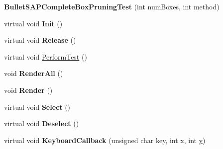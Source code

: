 \begin{DoxyCompactItemize}
\item 
\hypertarget{class_bullet_s_a_p_complete_box_pruning_test_a22620b06b80e57d7f88db4c8ce24dda7}{{\bfseries Bullet\+S\+A\+P\+Complete\+Box\+Pruning\+Test} (int num\+Boxes, int method)}\label{class_bullet_s_a_p_complete_box_pruning_test_a22620b06b80e57d7f88db4c8ce24dda7}

\item 
\hypertarget{class_bullet_s_a_p_complete_box_pruning_test_aa8e8f60057c773281c729fdcfbbc0212}{virtual void {\bfseries Init} ()}\label{class_bullet_s_a_p_complete_box_pruning_test_aa8e8f60057c773281c729fdcfbbc0212}

\item 
\hypertarget{class_bullet_s_a_p_complete_box_pruning_test_a7bbd4336f1ada389a32fe81e4b39b136}{virtual void {\bfseries Release} ()}\label{class_bullet_s_a_p_complete_box_pruning_test_a7bbd4336f1ada389a32fe81e4b39b136}

\item 
virtual void \hyperlink{class_bullet_s_a_p_complete_box_pruning_test_a08a41d61879ea44c1067dc6e5c84beb9}{Perform\+Test} ()
\item 
\hypertarget{class_bullet_s_a_p_complete_box_pruning_test_afbf20b80ce78fae72d856dcda51bc047}{void {\bfseries Render\+All} ()}\label{class_bullet_s_a_p_complete_box_pruning_test_afbf20b80ce78fae72d856dcda51bc047}

\item 
\hypertarget{class_bullet_s_a_p_complete_box_pruning_test_a24dcf93dc7ff584df374dcbe9adc5862}{void {\bfseries Render} ()}\label{class_bullet_s_a_p_complete_box_pruning_test_a24dcf93dc7ff584df374dcbe9adc5862}

\item 
\hypertarget{class_bullet_s_a_p_complete_box_pruning_test_aa82c03bc587bf7a4cbf635b015d66846}{virtual void {\bfseries Select} ()}\label{class_bullet_s_a_p_complete_box_pruning_test_aa82c03bc587bf7a4cbf635b015d66846}

\item 
\hypertarget{class_bullet_s_a_p_complete_box_pruning_test_a152f3dfbc27512b2c3bf30ec96bab372}{virtual void {\bfseries Deselect} ()}\label{class_bullet_s_a_p_complete_box_pruning_test_a152f3dfbc27512b2c3bf30ec96bab372}

\item 
\hypertarget{class_bullet_s_a_p_complete_box_pruning_test_ace55650fa88257f60135e0b13ef89819}{virtual void {\bfseries Keyboard\+Callback} (unsigned char key, int x, int \hyperlink{_ice_utils_8h_aa7ffaed69623192258fb8679569ff9ba}{y})}\label{class_bullet_s_a_p_complete_box_pruning_test_ace55650fa88257f60135e0b13ef89819}


\end{DoxyCompactItemize}
